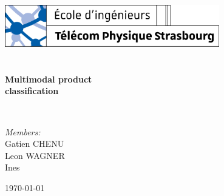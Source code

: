 \begin{titlepage}
	\begin{center}

		\includegraphics[width=0.7\textwidth]{images/Logo_Télécom_Physique_Strasbourg.png}~\\[1.5cm]


		\textsc{\Large }\\[0.5cm]

		\HRule \\[0.4cm]

		{\huge \bfseries Multimodal product\\
		classification\\[0.4cm] }

		\HRule \\[7cm]

		\begin{minipage}{0.4\textwidth}
			\begin{flushleft} \large
				\emph{Members:}\\
				Gatien \textsc{CHENU}\\
				Leon \textsc{WAGNER}\\
				Ines \textsc{}
			\end{flushleft}
		\end{minipage}


		\vfill

		{\large \today}

	\end{center}
\end{titlepage}